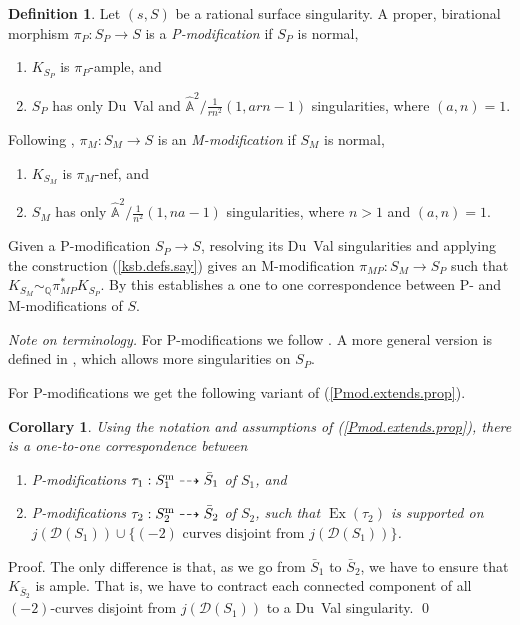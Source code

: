\documentclass{amsart}
\newtheorem{cor}[thm]{Corollary}
\theoremstyle{definition}
\newtheorem{defn}[thm]{Definition}
\theoremstyle{remark}
\renewcommand{\a}[0]{\hat{\mathbb A}}
\newcommand{\q}[0]{{\mathbb Q}}
\newcommand{\map}[0]{\dasharrow}
\newcommand{\ex}[0]{\operatorname{Ex}}
\newcommand{\simq}[0]{\sim_{\q}}
\begin{document}
\begin{defn}\label{P+M.defn}
  Let $(s,S)$ be a rational surface singularity. A proper, birational morphism $\pi_P:S_P\to S$ is a {\it P-modification}
if $S_P$ is normal,
\begin{enumerate}
\item $K_{S_P}$ is $\pi_P$-ample, and
\item $S_P$ has only Du~Val and $\a^2/\tfrac1{rn^2}(1, arn{-}1)$ singularities, where  $(a,n)=1$.
\end{enumerate}
Following  \cite{be-ch}, $\pi_M:S_M\to S$ is an
 {\it M-modification} if  $S_M$ is normal,
\begin{enumerate}
\item $K_{S_M}$ is $\pi_M$-nef, and
\item $S_M$ has only  $\a^2/\tfrac1{n^2}(1, na{-}1)$ singularities, where  $n>1$ and $(a,n)=1$.
\end{enumerate}
Given a P-modification  $S_P\to S$, resolving its Du~Val  singularities and applying the construction (\ref{ksb.defs.say}) 
gives an M-modification $\pi_{MP}:S_M\to S_P$ such that
$K_{S_M}\simq \pi_{MP}^*K_{S_P}$. By \cite{be-ch} this establishes a
one to one correspondence between P- and M-modifications of $S$.

{\it Note on terminology.} For P-modifications we follow \cite[3.8]{ksb}.
A more general version is defined in \cite[6.2.13]{k-etc}, which allows more  singularities on $S_P$.
\end{defn}

For P-modifications  we get the following variant of (\ref{Pmod.extends.prop}).



\begin{cor}\label{Pmod.extends.prop.cor} Using the notation and assumptions of (\ref{Pmod.extends.prop}), there is a one-to-one correspondence between
    \begin{enumerate}
      \item P-modifications $\tau_1: S_1^{\rm m}\map  \bar S_1$ of $S_1$, and
      \item P-modifications  $\tau_2: S_2^{\rm m}\map \bar S_2$ of $S_2$,  such that $\ex(\tau_2)$ is  supported on
        $j( {\mathcal D}(S_1))\cup\{(-2)\mbox{ curves disjoint from }j( {\mathcal D}(S_1))\} $.
    \end{enumerate}
\end{cor}

Proof. The only difference is that, as we go from $\bar S_1$ to $\bar S_2$, we have to ensure that $K_{\bar S_2}$ is ample. That is, we have to contract
each connected component of  all $(-2)$-curves disjoint from $j( {\mathcal D}(S_1))$ to  a Du~Val singularity. \qed
\end{document}
